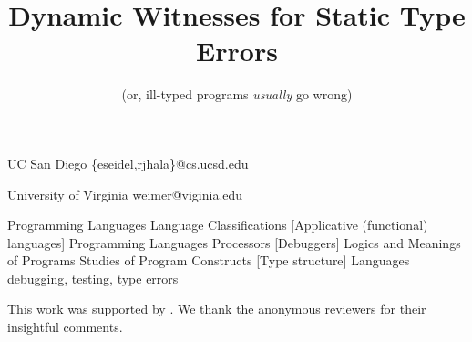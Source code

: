\documentclass[9pt,numbers]{sigplanconf}
\theoremstyle{plain}%
\theoremstyle{definition}
\newcommand{\isTechReport}{false} %
\newcommand\includeTechReport[1]{%
  \ifthenelse{\equal{\isTechReport}{true}}
    {{#1}}
    {\ignorespaces}
\xspace}
\begin{document}
\toappear{}

\title{Dynamic Witnesses for Static Type Errors}

\subtitle{(or, ill-typed programs \emph{usually} go wrong)}

           {UC San Diego}
           {\{eseidel,rjhala\}@cs.ucsd.edu}

           {University of Virginia}
           {weimer@viginia.edu}

\maketitle





         {Programming Languages}
         {Language Classifications}
         [Applicative (functional) languages]
         {Programming Languages}
         {Processors}
         [Debuggers]
         {Logics and Meanings of Programs}
         {Studies of Program Constructs}
         [Type structure]
\terms
Languages
\keywords
debugging, testing, type errors






% 


% 

\acks
This work was supported by .
%
We thank the anonymous reviewers for their insightful comments.

{


}

\includeTechReport
{
\newpage
\appendix

%
}
\end{document}
